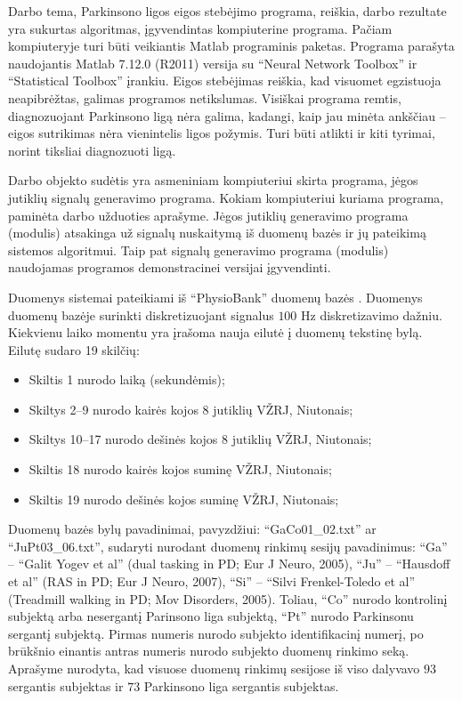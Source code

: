 \documentclass[]{vgtuef}
\begin{document}
Darbo tema, Parkinsono ligos eigos stebėjimo programa, reiškia, darbo rezultate yra sukurtas algoritmas, įgyvendintas kompiuterine programa. Pačiam kompiuteryje turi būti veikiantis Matlab programinis paketas. Programa parašyta naudojantis Matlab 7.12.0 (R2011) versija su ``Neural Network Toolbox'' ir ``Statistical Toolbox'' įrankiu. Eigos stebėjimas reiškia, kad visuomet egzistuoja neapibrėžtas, galimas programos netikslumas. Visiškai programa remtis, diagnozuojant Parkinsono ligą nėra galima, kadangi, kaip jau minėta ankščiau -- eigos sutrikimas nėra vienintelis ligos požymis. Turi būti atlikti ir kiti tyrimai, norint tiksliai diagnozuoti ligą.

Darbo objekto sudėtis yra asmeniniam kompiuteriui skirta programa, jėgos jutiklių signalų generavimo programa. Kokiam kompiuteriui kuriama programa, paminėta darbo užduoties aprašyme. Jėgos jutiklių generavimo programa (modulis) atsakinga už signalų nuskaitymą iš duomenų bazės ir jų pateikimą sistemos algoritmui. Taip pat signalų generavimo programa (modulis) naudojamas programos demonstracinei versijai įgyvendinti.

Duomenys sistemai pateikiami iš ``PhysioBank'' duomenų bazės \cite{932728}. Duomenys duomenų bazėje surinkti diskretizuojant signalus $100$ Hz diskretizavimo dažniu. Kiekvienu laiko momentu yra įrašoma nauja eilutė į duomenų tekstinę bylą. Eilutę sudaro 19 skilčių:

\begin{itemize}
\item Skiltis 1 nurodo laiką (sekundėmis);
\item Skiltys 2--9 nurodo kairės kojos 8 jutiklių VŽRJ, Niutonais;
\item Skiltys 10--17 nurodo dešinės kojos 8 jutiklių VŽRJ, Niutonais;
\item Skiltis 18 nurodo kairės kojos suminę VŽRJ, Niutonais;
\item Skiltis 19 nurodo dešinės kojos suminę VŽRJ, Niutonais;
\end{itemize}

Duomenų bazės bylų pavadinimai, pavyzdžiui: ``GaCo01\_02.txt'' ar ``JuPt03\_06.txt'', sudaryti nurodant duomenų rinkimų sesijų pavadinimus: ``Ga'' -- ``Galit Yogev et al'' (dual tasking in PD; Eur J Neuro, 2005), ``Ju'' -- ``Hausdoff et al'' (RAS in PD; Eur J Neuro, 2007), ``Si'' -- ``Silvi Frenkel-Toledo et al'' (Treadmill walking in PD; Mov Disorders, 2005). Toliau, ``Co'' nurodo kontrolinį subjektą arba nesergantį Parinsono liga subjektą, ``Pt'' nurodo Parkinsonu sergantį subjektą. Pirmas numeris nurodo subjekto identifikacinį numerį, po brūkšnio einantis antras numeris nurodo subjekto duomenų rinkimo seką. Aprašyme nurodyta, kad visuose duomenų rinkimų sesijose iš viso dalyvavo $93$ sergantis subjektas ir $73$ Parkinsono liga sergantis subjektas.
\end{document}
